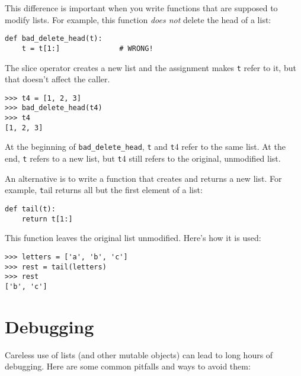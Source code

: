\documentclass[
DIV=11,
fontsize=13,
twoside,
headinclude=false,
titlepage=firstiscover,
abstract=true,
headsepline=true,
footsepline=true,
chapterprefix=true, %
headings=big,
bibliography=totoc,%
captions=tableheading
]{scrbook}
\theoremstyle{definition}
\begin{document}
This difference is important when you write functions that
are supposed to modify lists.  For example, this function
{\em does not} delete the head of a list:
%
\begin{lstlisting}
def bad_delete_head(t):
    t = t[1:]              # WRONG!
\end{lstlisting}
%
The slice operator creates a new list and the assignment
makes {\texttt t} refer to it, but that doesn't affect the caller.
%
\begin{lstlisting}
>>> t4 = [1, 2, 3]
>>> bad_delete_head(t4)
>>> t4
[1, 2, 3]
\end{lstlisting}
%
At the beginning of \verb"bad_delete_head", {\texttt t} and {\texttt t4}
refer to the same list.  At the end, {\texttt t} refers to a new list,
but {\texttt t4} still refers to the original, unmodified list.

An alternative is to write a function that creates and
returns a new list.  For
example, {\texttt tail} returns all but the first
element of a list:

\begin{lstlisting}
def tail(t):
    return t[1:]
\end{lstlisting}
%
This function leaves the original list unmodified.
Here's how it is used:

\begin{lstlisting}
>>> letters = ['a', 'b', 'c']
>>> rest = tail(letters)
>>> rest
['b', 'c']
\end{lstlisting}



\section{Debugging}

Careless use of lists (and other mutable objects)
can lead to long hours of debugging.  Here are some common
pitfalls and ways to avoid them:
\end{document}
